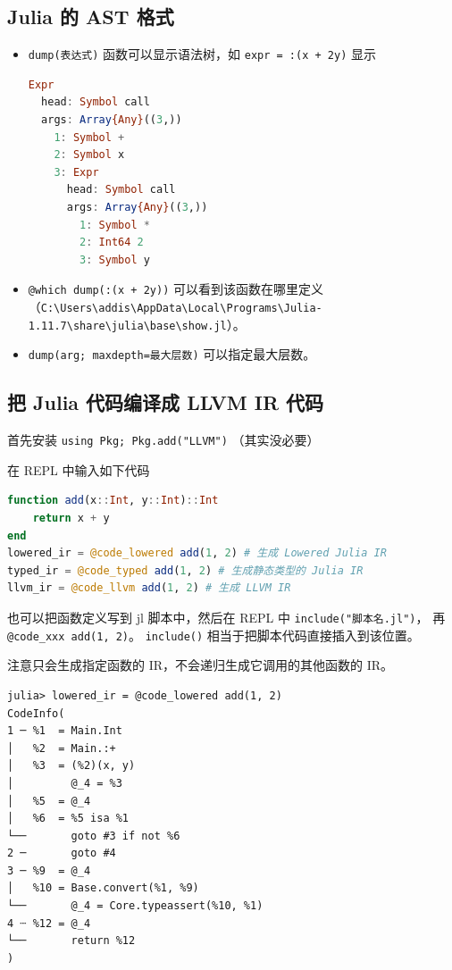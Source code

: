 \subsection{Julia 的 AST 格式}
\begin{itemize}
\item \verb`dump(表达式)` 函数可以显示语法树，如 \verb`expr = :(x + 2y)` 显示
\begin{lstlisting}[language=julia]
Expr
  head: Symbol call
  args: Array{Any}((3,))
    1: Symbol +
    2: Symbol x
    3: Expr
      head: Symbol call
      args: Array{Any}((3,))
        1: Symbol *
        2: Int64 2
        3: Symbol y
\end{lstlisting}
\item \verb`@which dump(:(x + 2y))` 可以看到该函数在哪里定义（\verb`C:\Users\addis\AppData\Local\Programs\Julia-1.11.7\share\julia\base\show.jl`）。
\item \verb`dump(arg; maxdepth=最大层数)` 可以指定最大层数。
\end{itemize}


\subsection{把 Julia 代码编译成 LLVM IR 代码}
首先安装 \verb`using Pkg; Pkg.add("LLVM")` （其实没必要）

在 REPL 中输入如下代码
\begin{lstlisting}[language=julia,caption=julia]
function add(x::Int, y::Int)::Int
    return x + y
end
lowered_ir = @code_lowered add(1, 2) # 生成 Lowered Julia IR
typed_ir = @code_typed add(1, 2) # 生成静态类型的 Julia IR
llvm_ir = @code_llvm add(1, 2) # 生成 LLVM IR
\end{lstlisting}

也可以把函数定义写到 jl 脚本中，然后在 REPL 中 \verb`include("脚本名.jl")`， 再 \verb`@code_xxx add(1, 2)`。 \verb`include()` 相当于把脚本代码直接插入到该位置。

注意只会生成指定函数的 IR，不会递归生成它调用的其他函数的 IR。

\begin{lstlisting}[language=none,caption=julia ir]
julia> lowered_ir = @code_lowered add(1, 2)
CodeInfo(
1 ─ %1  = Main.Int
│   %2  = Main.:+
│   %3  = (%2)(x, y)   
│         @_4 = %3
│   %5  = @_4
│   %6  = %5 isa %1
└──       goto #3 if not %6
2 ─       goto #4
3 ─ %9  = @_4
│   %10 = Base.convert(%1, %9)
└──       @_4 = Core.typeassert(%10, %1)
4 ┄ %12 = @_4
└──       return %12
)
\end{lstlisting}

